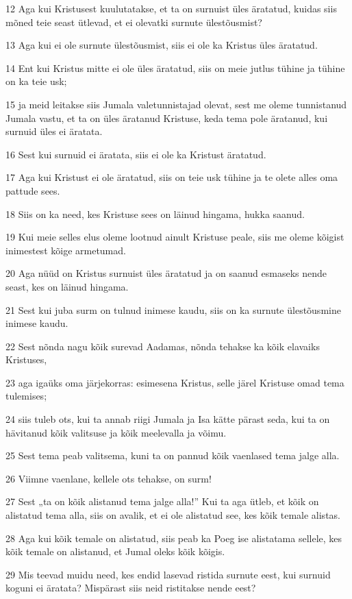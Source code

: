 \par 12 Aga kui Kristusest kuulutatakse, et ta on surnuist üles äratatud, kuidas siis mõned teie seast ütlevad, et ei olevatki surnute ülestõusmist?
\par 13 Aga kui ei ole surnute ülestõusmist, siis ei ole ka Kristus üles äratatud.
\par 14 Ent kui Kristus mitte ei ole üles äratatud, siis on meie jutlus tühine ja tühine on ka teie usk;
\par 15 ja meid leitakse siis Jumala valetunnistajad olevat, sest me oleme tunnistanud Jumala vastu, et ta on üles äratanud Kristuse, keda tema pole äratanud, kui surnuid üles ei äratata.
\par 16 Sest kui surnuid ei äratata, siis ei ole ka Kristust äratatud.
\par 17 Aga kui Kristust ei ole äratatud, siis on teie usk tühine ja te olete alles oma pattude sees.
\par 18 Siis on ka need, kes Kristuse sees on läinud hingama, hukka saanud.
\par 19 Kui meie selles elus oleme lootnud ainult Kristuse peale, siis me oleme kõigist inimestest kõige armetumad.
\par 20 Aga nüüd on Kristus surnuist üles äratatud ja on saanud esmaseks nende seast, kes on läinud hingama.
\par 21 Sest kui juba surm on tulnud inimese kaudu, siis on ka surnute ülestõusmine inimese kaudu.
\par 22 Sest nõnda nagu kõik surevad Aadamas, nõnda tehakse ka kõik elavaiks Kristuses,
\par 23 aga igaüks oma järjekorras: esimesena Kristus, selle järel Kristuse omad tema tulemises;
\par 24 siis tuleb ots, kui ta annab riigi Jumala ja Isa kätte pärast seda, kui ta on hävitanud kõik valitsuse ja kõik meelevalla ja võimu.
\par 25 Sest tema peab valitsema, kuni ta on pannud kõik vaenlased tema jalge alla.
\par 26 Viimne vaenlane, kellele ots tehakse, on surm!
\par 27 Sest „ta on kõik alistanud tema jalge alla!” Kui ta aga ütleb, et kõik on alistatud tema alla, siis on avalik, et ei ole alistatud see, kes kõik temale alistas.
\par 28 Aga kui kõik temale on alistatud, siis peab ka Poeg ise alistatama sellele, kes kõik temale on alistanud, et Jumal oleks kõik kõigis.
\par 29 Mis teevad muidu need, kes endid lasevad ristida surnute eest, kui surnuid koguni ei äratata? Mispärast siis neid ristitakse nende eest?
